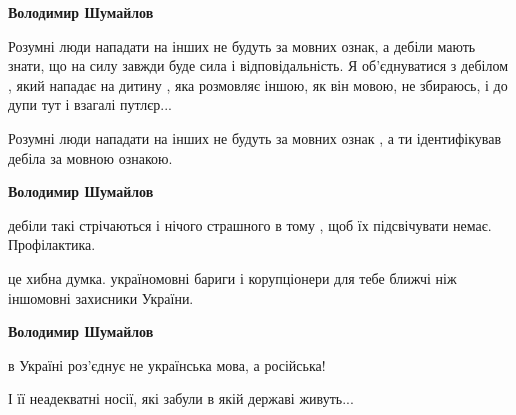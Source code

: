 \begin{itemize}
\begin{itemize}
 
\textbf{Володимир Шумайлов} 

Розумні люди нападати на інших не будуть за мовних ознак, а дебіли мають знати,
що на силу завжди буде сила і відповідальність. Я об'єднуватися з дебілом ,
який нападає на дитину , яка розмовляє іншою, як він мовою, не збираюсь, і до
дупи тут і взагалі путлєр...


 

Розумні люди нападати на інших не будуть за мовних ознак , а ти ідентифікував
дебіла за мовною ознакою.


 
\textbf{Володимир Шумайлов} 

дебіли такі стрічаються і нічого страшного в тому , щоб їх підсвічувати немає.
Профілактика.

 
це хибна думка. україномовні бариги і корупціонери для тебе ближчі ніж іншомовні захисники України.

 
\textbf{Володимир Шумайлов} 

в Україні роз'єднує не українська мова, а російська!

І її неадекватні носії, які забули в якій державі живуть...



\end{itemize}
\end{itemize}
